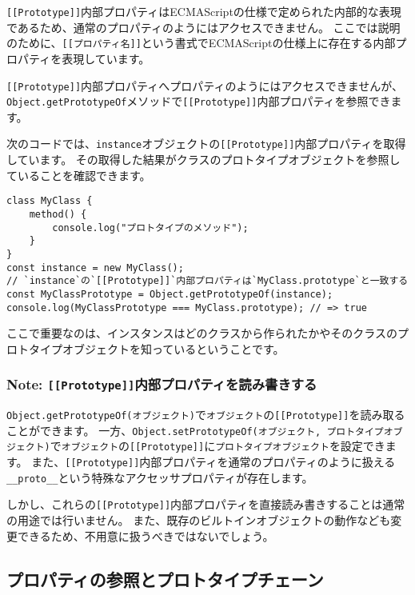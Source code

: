 \texttt{[[Prototype]]}内部プロパティはECMAScriptの仕様で定められた内部的な表現であるため、通常のプロパティのようにはアクセスできません。
ここでは説明のために、\texttt{[[プロパティ名]]}という書式でECMAScriptの仕様上に存在する内部プロパティを表現しています。

\texttt{[[Prototype]]}内部プロパティへプロパティのようにはアクセスできませんが、\texttt{Object.getPrototypeOf}メソッドで\texttt{[[Prototype]]}内部プロパティを参照できます。

次のコードでは、\texttt{instance}オブジェクトの\texttt{[[Prototype]]}内部プロパティを取得しています。
その取得した結果がクラスのプロトタイプオブジェクトを参照していることを確認できます。

\begin{lstlisting}
class MyClass {
    method() {
        console.log("プロトタイプのメソッド");
    }
}
const instance = new MyClass();
// `instance`の`[[Prototype]]`内部プロパティは`MyClass.prototype`と一致する
const MyClassPrototype = Object.getPrototypeOf(instance);
console.log(MyClassPrototype === MyClass.prototype); // => true
\end{lstlisting}

ここで重要なのは、インスタンスはどのクラスから作られたかやそのクラスのプロトタイプオブジェクトを知っているということです。

\hypertarget{inner-property}{%
\subsubsection{\texorpdfstring{Note:
\texttt{{[}{[}Prototype{]}{]}}内部プロパティを読み書きする}{Note: {[}{[}Prototype{]}{]}内部プロパティを読み書きする}}\label{inner-property}}

\texttt{Object.getPrototypeOf(オブジェクト)}で\texttt{オブジェクト}の\texttt{[[Prototype]]}を読み取ることができます。
一方、\texttt{Object.setPrototypeOf(オブジェクト, プロトタイプオブジェクト)}で\texttt{オブジェクト}の\texttt{[[Prototype]]}に\texttt{プロトタイプオブジェクト}を設定できます。
また、\texttt{[[Prototype]]}内部プロパティを通常のプロパティのように扱える\texttt{\_\_proto\_\_}という特殊なアクセッサプロパティが存在します。

しかし、これらの\texttt{[[Prototype]]}内部プロパティを直接読み書きすることは通常の用途では行いません。
また、既存のビルトインオブジェクトの動作なども変更できるため、不用意に扱うべきではないでしょう。

\hypertarget{read-prototype-chain}{%
\subsection{プロパティの参照とプロトタイプチェーン}\label{read-prototype-chain}}

